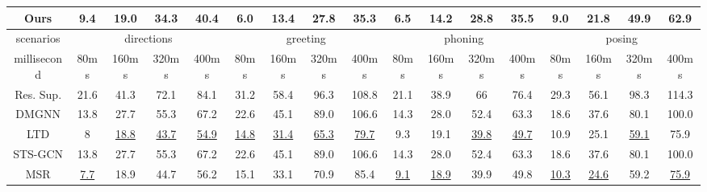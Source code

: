 \begin{table}[h]
{\begin{tabular}{c|cccc|cccc|cccc|cccc}
    Ours   & \textbf{9.4}  & \textbf{19.0} & \textbf{34.3} & \textbf{40.4} & \textbf{6.0}  & \textbf{13.4} & \textbf{27.8} & \textbf{35.3} & \textbf{6.5}  & \textbf{14.2} & \textbf{28.8} & \textbf{35.5} & \textbf{9.0} & \textbf{21.8} & \textbf{49.9} & \textbf{62.9} \\\hline
    scenarios   & \multicolumn{4}{c|}{directions}                                & \multicolumn{4}{c|}{greeting}                                  & \multicolumn{4}{c|}{phoning}                                   & \multicolumn{4}{c}{posing}                                   \\ \hline
    millisecond & 80ms          & 160ms         & 320ms         & 400ms         & 80ms          & 160ms         & 320ms         & 400ms         & 80ms          & 160ms         & 320ms         & 400ms         & 80ms         & 160ms         & 320ms         & 400ms         \\ \hline
    Res. Sup.   & 21.6          & 41.3          & 72.1          & 84.1          & 31.2          & 58.4          & 96.3          & 108.8         & 21.1          & 38.9          & 66            & 76.4          & 29.3         & 56.1          & 98.3          & 114.3         \\
    DMGNN & 13.8          & 27.7          & 55.3          & 67.2          & 22.6          & 45.1          & 89.0          & 106.6         & 14.3          & 28.0          & 52.4          & 63.3          & 18.6         & 37.6          & 80.1          & 100.0         \\
    LTD   & 8             & \underline{18.8}          & \underline{43.7}          & \underline{54.9}          & \underline{14.8}          & \underline{31.4}          & \underline{65.3}          & \underline{79.7}          & 9.3           & 19.1          & \underline{39.8}          & \underline{49.7}          & 10.9         & 25.1          & \underline{59.1}          & 75.9          \\
    STS-GCN & 13.8          & 27.7          & 55.3          & 67.2          & 22.6          & 45.1          & 89.0          & 106.6         & 14.3          & 28.0          & 52.4          & 63.3          & 18.6         & 37.6          & 80.1          & 100.0         \\
    MSR   & \underline{7.7}           & 18.9          & 44.7          & 56.2          & 15.1          & 33.1          & 70.9          & 85.4          & \underline{9.1}           & \underline{18.9}          & 39.9          & 49.8          & \underline{10.3}         & \underline{24.6}          & 59.2          & \underline{75.9}          \\

\end{tabular}}
\end{table}
